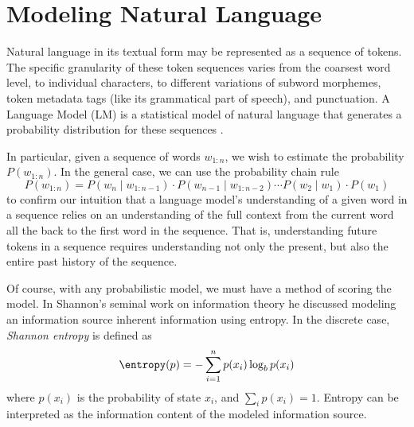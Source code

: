 \section{Modeling Natural Language}\label{sec:introduction:language-models}

Natural language in its textual form may be represented as a sequence of tokens.
The specific granularity of these token sequences varies from the coarsest word level, to individual characters, to different variations of subword morphemes, token metadata tags (like its grammatical part of speech), and punctuation.
A Language Model (LM) is a statistical model of natural language that generates a probability distribution for these sequences \cite{pappas_meyer_2012,goldberg_2017}.

In particular, given a sequence of words $w_{1:n}$, we wish to estimate the probability $P(w_{1:n})$.
In the general case, we can use the probability chain rule
\begin{equation}
    P(w_{1:n}) = P(w_n \mid w_{1:n - 1}) \cdot P(w_{n - 1} \mid w_{1:n - 2}) \cdots P(w_2 \mid w_1) \cdot P(w_1)\label{eq:language-models:chain-rule}
\end{equation}
to confirm our intuition that a language model's understanding of a given word in a sequence relies on an understanding of the full context from the current word all the back to the first word in the sequence.
That is, understanding future tokens in a sequence requires understanding not only the present, but also the entire past history of the sequence.

Of course, with any probabilistic model, we must have a method of scoring the model.
In Shannon's seminal work on information theory \cite{Shannon1948} he discussed modeling an information source inherent information using entropy.
In the discrete case, \textit{Shannon entropy} is defined as
\begin{equation}
    \entropy(p) = - \sum_{i=1}^n p(x_i) \log_b p(x_i) \label{eq:language-models:entropy}
\end{equation}
where $p(x_i)$ is the probability of state $x_i$, and $\sum_i p(x_i) = 1$.
Entropy can be interpreted as the information content of the modeled information source.

